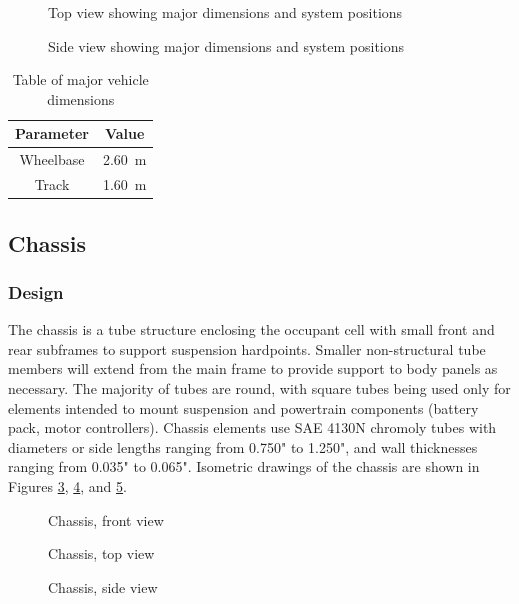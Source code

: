 \documentclass[10pt]{article}
\begin{document}
\begin{figure}
\centering
\caption{Top view showing major dimensions and system positions}
\label{fig:msxii-top-view}
\end{figure}

\begin{figure}
\centering
\caption{Side view showing major dimensions and system positions}
\label{fig:msxii-side-view}
\end{figure}

\begin{table}
\centering
\begin{tabular}{cc}
\toprule
Parameter & Value \\
\midrule
Wheelbase & \SI{2.60}{\metre} \\
Track     & \SI{1.60}{\metre} \\
\bottomrule
\end{tabular}
\caption{Table of major vehicle dimensions}
\label{tab:msxii-dimensions}
\end{table}

\subsection{Chassis}
\subsubsection{Design}
The chassis is a tube structure enclosing the occupant cell with small front and rear subframes to support suspension hardpoints. Smaller non-structural tube members will extend from the main frame to provide support to body panels as necessary. The majority of tubes are round, with square tubes being used only for elements intended to mount suspension and powertrain components (battery pack, motor controllers). Chassis elements use SAE 4130N chromoly tubes with diameters or side lengths ranging from 0.750" to 1.250", and wall thicknesses ranging from 0.035" to 0.065". Isometric drawings of the chassis are shown in Figures \ref{fig:chassis-front}, \ref{fig:chassis-top}, and \ref{fig:chassis-side}.

\begin{figure}
\centering
\caption{Chassis, front view}
\label{fig:chassis-front}
\end{figure}
\begin{figure}
\centering
\caption{Chassis, top view}
\label{fig:chassis-top}
\end{figure}
\begin{figure}
\centering
\caption{Chassis, side view}
\label{fig:chassis-side}
\end{figure}
\end{document}
